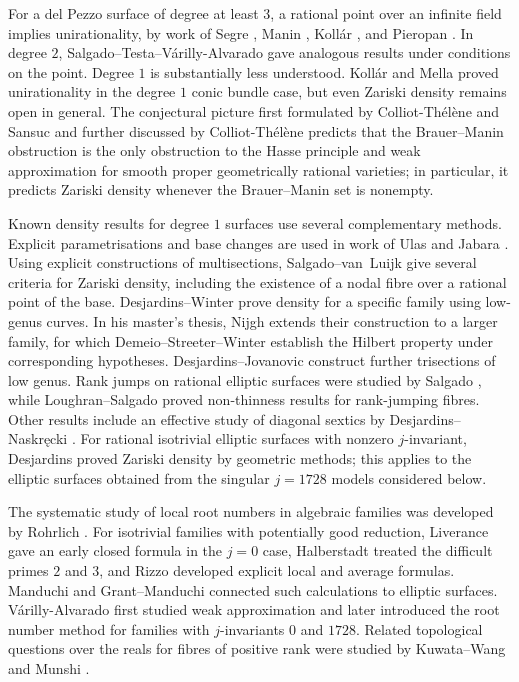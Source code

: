 \documentclass[12pt,reqno]{amsart}
\numberwithin{equation}{section}
\theoremstyle{definition}
\begin{document}
For a del Pezzo surface of degree at least $3$, a rational point over an infinite field implies unirationality, by work of Segre \cite{Seg1,Seg2}, Manin \cite{Man}, Koll\'ar \cite{Kol}, and Pieropan \cite{Pie}.
In degree $2$, Salgado--Testa--V\'arilly-Alvarado \cite{STVA} gave analogous results under conditions on the point.
Degree $1$ is substantially less understood.
Koll\'ar and Mella \cite[Theorem~7]{KM} proved unirationality in the degree $1$ conic bundle case, but even Zariski density remains open in general.
The conjectural picture first formulated by Colliot-Th\'el\`ene and Sansuc \cite{CTS} and further discussed by Colliot-Th\'el\`ene \cite{CTAWS,CT-pencil} predicts that the Brauer--Manin obstruction is the only obstruction to the Hasse principle and weak approximation for smooth proper geometrically rational varieties; in particular, it predicts Zariski density whenever the Brauer--Manin set is nonempty.

Known density results for degree $1$ surfaces use several complementary methods.
Explicit parametrisations and base changes are used in work of Ulas \cite{Ula1,Ula2} and Jabara \cite{Jab}.
Using explicit constructions of multisections, Salgado--van~Luijk \cite[Theorem~1.4]{SvL} give several criteria for Zariski density, including the existence of a nodal fibre over a rational point of the base.
Desjardins--Winter \cite{DWi} prove density for a specific family using low-genus curves.
In his master's thesis, Nijgh \cite{Nijgh} extends their construction to a larger family, for which Demeio--Streeter--Winter \cite{DeStWi} establish the Hilbert property under corresponding hypotheses.
Desjardins--Jovanovic \cite{DJ25} construct further trisections of low genus.
Rank jumps on rational elliptic surfaces were studied by Salgado \cite{Sal12}, while Loughran--Salgado \cite{LS22} proved non-thinness results for rank-jumping fibres.
Other results include an effective study of diagonal sextics by Desjardins--Naskr\k{e}cki \cite{DN24}.
For rational isotrivial elliptic surfaces with nonzero $j$-invariant, Desjardins \cite{Des} proved Zariski density by geometric methods; this applies to the elliptic surfaces obtained from the singular $j=1728$ models considered below.

The systematic study of local root numbers in algebraic families was developed by Rohrlich \cite{Roh93,Roh96}.
For isotrivial families with potentially good reduction, Liverance \cite{Liv95} gave an early closed formula in the $j=0$ case, Halberstadt \cite{Hal98} treated the difficult primes $2$ and $3$, and Rizzo \cite{Riz03} developed explicit local and average formulas.
Manduchi \cite{Man95} and Grant--Manduchi \cite{GM97,GM98} connected such calculations to elliptic surfaces.
V\'arilly-Alvarado \cite{VA08,VA} first studied weak approximation and later introduced the root number method for families with $j$-invariants $0$ and $1728$.
Related topological questions over the reals for fibres of positive rank were studied by Kuwata--Wang \cite{KW93} and Munshi \cite{Mun07,Mun10}.
\end{document}
